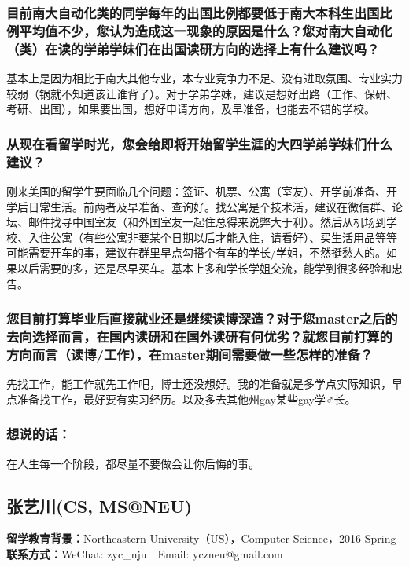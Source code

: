 \documentclass[a4paper,UTF8]{book}
\begin{document}
    \subsubsection*{目前南大自动化类的同学每年的出国比例都要低于南大本科生出国比例平均值不少，您认为造成这一现象的原因是什么？您对南大自动化（类）在读的学弟学妹们在出国读研方向的选择上有什么建议吗？}
    基本上是因为相比于南大其他专业，本专业竞争力不足、没有进取氛围、专业实力较弱（锅就不知道该让谁背了）。对于学弟学妹，建议是想好出路（工作、保研、考研、出国），如果要出国，想好申请方向，及早准备，也能去不错的学校。

    \subsubsection*{从现在看留学时光，您会给即将开始留学生涯的大四学弟学妹们什么建议？}
    刚来美国的留学生要面临几个问题：签证、机票、公寓（室友）、开学前准备、开学后日常生活。前两者及早准备、查询好。找公寓是个技术活，建议在微信群、论坛、邮件找寻中国室友（和外国室友一起住总得来说弊大于利）。然后从机场到学校、入住公寓（有些公寓非要某个日期以后才能入住，请看好）、买生活用品等等可能需要开车的事，建议在群里早点勾搭个有车的学长/学姐，不然挺愁人的。如果以后需要的多，还是尽早买车。基本上多和学长学姐交流，能学到很多经验和忠告。

    \subsubsection*{您目前打算毕业后直接就业还是继续读博深造？对于您master之后的去向选择而言，在国内读研和在国外读研有何优劣？就您目前打算的方向而言（读博/工作），在master期间需要做一些怎样的准备？}
    先找工作，能工作就先工作吧，博士还没想好。我的准备就是多学点实际知识，早点准备找工作，最好要有实习经历。以及多去其他州gay某些gay学$\male$长。

    \subsubsection{想说的话：}
    在人生每一个阶段，都尽量不要做会让你后悔的事。

\clearpage
\subsection{张艺川(CS, MS@NEU)}
    \textbf{留学教育背景：}Northeastern University（US），Computer Science，2016 Spring\\
    \textbf{联系方式：}WeChat: zyc\_nju$\quad$Email: yczneu@gmail.com
\end{document}
